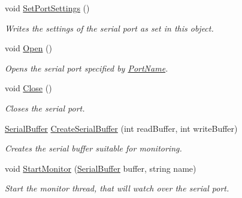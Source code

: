 \begin{DoxyCompactItemize}
void \mbox{\hyperlink{interface_r_j_c_p_1_1_i_o_1_1_ports_1_1_native_1_1_i_native_serial_a56ae928a722facd5c4a885eee8c72455}{Set\+Port\+Settings}} ()
\begin{DoxyCompactList}\small\item\em Writes the settings of the serial port as set in this object. \end{DoxyCompactList}\item 
void \mbox{\hyperlink{interface_r_j_c_p_1_1_i_o_1_1_ports_1_1_native_1_1_i_native_serial_aad8e5adb7a536fd4645f387003bed473}{Open}} ()
\begin{DoxyCompactList}\small\item\em Opens the serial port specified by \mbox{\hyperlink{interface_r_j_c_p_1_1_i_o_1_1_ports_1_1_native_1_1_i_native_serial_a842f968b9a75d13f2bf405597513e46a}{Port\+Name}}. \end{DoxyCompactList}\item 
void \mbox{\hyperlink{interface_r_j_c_p_1_1_i_o_1_1_ports_1_1_native_1_1_i_native_serial_adb88604917c61a951ee180962aa81ce1}{Close}} ()
\begin{DoxyCompactList}\small\item\em Closes the serial port. \end{DoxyCompactList}\item 
\mbox{\hyperlink{class_r_j_c_p_1_1_i_o_1_1_ports_1_1_native_1_1_serial_buffer}{Serial\+Buffer}} \mbox{\hyperlink{interface_r_j_c_p_1_1_i_o_1_1_ports_1_1_native_1_1_i_native_serial_a15155443dbfd8aead3cc4ade53b1fa2b}{Create\+Serial\+Buffer}} (int read\+Buffer, int write\+Buffer)
\begin{DoxyCompactList}\small\item\em Creates the serial buffer suitable for monitoring. \end{DoxyCompactList}\item 
void \mbox{\hyperlink{interface_r_j_c_p_1_1_i_o_1_1_ports_1_1_native_1_1_i_native_serial_a64481becda92f402e2eb7728ceb9de06}{Start\+Monitor}} (\mbox{\hyperlink{class_r_j_c_p_1_1_i_o_1_1_ports_1_1_native_1_1_serial_buffer}{Serial\+Buffer}} buffer, string name)
\begin{DoxyCompactList}\small\item\em Start the monitor thread, that will watch over the serial port. \end{DoxyCompactList}\end{DoxyCompactItemize}
